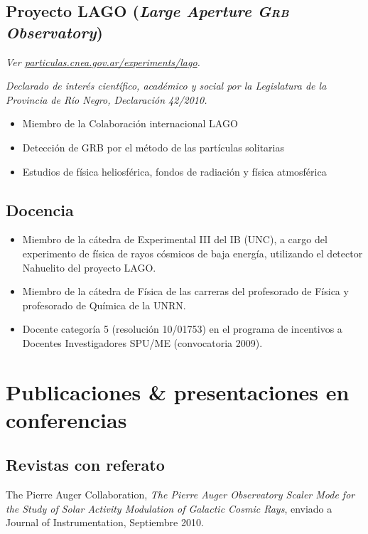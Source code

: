 \documentclass[11pt, a4paper]{article}
\newcommand{\years}[1]{\marginnote{\scriptsize #1}}
\begin{document}
\subsection*{Proyecto LAGO ({\emph{Large Aperture \textsc{Grb} Observatory}})}
\small\textit{Ver
\href{http://particulas.cnea.gov.ar/experiments/lago/}{particulas.cnea.gov.ar/experiments/lago}.
}

{\emph{Declarado de interés científico, académico y social por la Legislatura de la
Provincia de Río Negro, Declaración 42/2010.}}

\begin{itemize}
\item Miembro de la Colaboración internacional LAGO
\item Detección de GRB por el método de las partículas solitarias
\item Estudios de física heliosférica, fondos de radiación y física atmosférica
\end{itemize}

\subsection*{Docencia}

\begin{itemize}
\item Miembro de la cátedra de Experimental III del IB (UNC), a cargo del experimento de física de rayos cósmicos de baja energía, utilizando el detector Nahuelito del proyecto LAGO. 
\item Miembro de la cátedra de Física de las carreras del profesorado de Física y profesorado de Química de la UNRN.
\item Docente categoría 5 (resolución 10/01753) en el programa de incentivos a Docentes Investigadores SPU/ME (convocatoria 2009).
\end{itemize}
 
\section*{Publicaciones \& presentaciones en conferencias}

\subsection*{Revistas con referato}
\noindent
\years{2010}The Pierre Auger Collaboration, {\emph{The Pierre Auger Observatory
Scaler Mode for the Study of Solar Activity Modulation of Galactic Cosmic
Rays}}, enviado a Journal of Instrumentation, Septiembre 2010.\\
\end{document}
